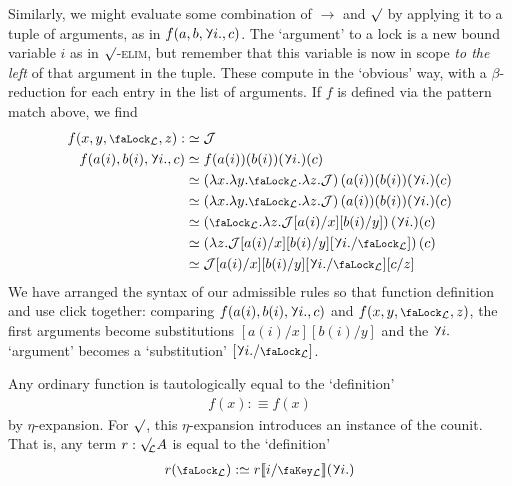 \documentclass[10pt]{article}
\theoremstyle{definition}
\let\oldequiv\equiv%
\renewcommand{\equiv}{\simeq}
\newcommand{\defeq}{\oldequiv}
\newcommand{\rulen}[1]{\textsc{#1}}
\newcommand{\judge}{\mathcal{J}}
\newcommand{\lock}{\mathchoice {\scalebox{0.8}{\text{\faLock}}}
  {\scalebox{0.8}{\text{\faLock}}} {\scalebox{0.5}{\text{\faLock}}}
  {\scalebox{0.4}{\text{\faLock}}} }
\newcommand{\key}{\mathchoice
  {\scalebox{0.8}{\text{\faKey}}} {\scalebox{0.8}{\text{\faKey}}}
  {\scalebox{0.5}{\text{\faKey}}} {\scalebox{0.4}{\text{\faKey}}} }
\newcommand{\rbindsym}{\raisebox{-0.5pt}{\scalerel*{\reflectbox{\rotatebox[origin=c]{185}{$\lambda$}}}{\lambda}}}
\newcommand{\rbind}[1]{\rbindsym{} #1.}
\newcommand{\lockn}[1]{\mathcal{#1}}
\newcommand{\ctxlocke}[1]{\lock_{#1}}
\newcommand{\ctxlock}[1]{\ctxlocke{\lockn{#1}}}
\newcommand{\stubra}[1]{\llbracket #1 \rrbracket}
\newcommand{\admbra}[1]{[ #1 ]}
\newcommand{\substucke}[2]{\stubra{#1/\key_{#2}}}
\newcommand{\substuck}[2]{\substucke{#1}{\lockn{#2}}}
\newcommand{\sublock}[2]{\admbra{\rbindsym{} #2. /\lock_{\lockn{#1}} }}
\newcommand{\rformsym}{\surd}
\newcommand{\rforme}[2]{\ThisStyle{\raisebox{0.07em}{$\SavedStyle \rformsym_{\hspace{-0.25em}#1}$}} #2}
\newcommand{\rform}[2]{\rforme{\lockn{#1}}{#2}}
\newcommand{\rintroe}[2]{\lock_{#1}. #2}
\newcommand{\rintro}[2]{\rintroe{\lockn{#1}}{#2}}
\begin{document}
Similarly, we might evaluate some combination of $\to$ and $\rformsym$
by applying it to a tuple of arguments, as in $f(a, b, \rbind{i}, c)$.
The `argument' to a lock is a new bound variable $i$ as in
\rulen{$\rformsym$-elim}, but remember that this variable is now in
scope \emph{to the left} of that argument in the tuple. These compute
in the `obvious' way, with a $\beta$-reduction for each entry in the
list of arguments. If $f$ is defined via the pattern match above, we
find
\begin{align*}
  f(x,y,\ctxlock{L},z)
  :&\defeq \judge \\
  f(a(i), b(i), \rbind{i}, c)
   &\defeq f(a(i))(b(i))(\rbind{i})(c) \\
   &\defeq \left( \lambda x. \lambda y. \rintro{L}{\lambda z. \judge} \right)(a(i))(b(i))(\rbind{i})(c) \\
   &\defeq \left( \lambda x. \lambda y. \rintro{L}{\lambda z. \judge} \right)(a(i))(b(i))(\rbind{i})(c) \\
   &\defeq  \left( \rintro{L}{\lambda z. \judge[a(i)/x][b(i)/y]} \right)(\rbind{i})(c) \\
   &\defeq  \left( \lambda z. \judge[a(i)/x][b(i)/y]\sublock{L}{i} \right)(c) \\
  &\defeq \judge[a(i)/x][b(i)/y]\sublock{L}{i}[c/z]
\end{align*}
We have arranged the syntax of our admissible rules so that function
definition and use click together: comparing
$f(a(i), b(i), \rbind{i}, c)$ and $f(x,y,\ctxlock{L},z)$, the first
arguments become substitutions $[a(i)/x][b(i)/y]$ and the $\rbind{i}$
`argument' becomes a `substitution' $\sublock{L}{i}$.

Any ordinary function is tautologically equal to the `definition'
\begin{align*}
  f(x) :\defeq f(x)
\end{align*}
by $\eta$-expansion. For $\rformsym$, this $\eta$-expansion introduces an
instance of the counit. That is, any term $r : \rform{L}{A}$ is equal to the `definition'
\begin{align*}
  r(\ctxlock{L}) :\defeq r\substuck{i}{L}(\rbind{i})
\end{align*}
\end{document}
